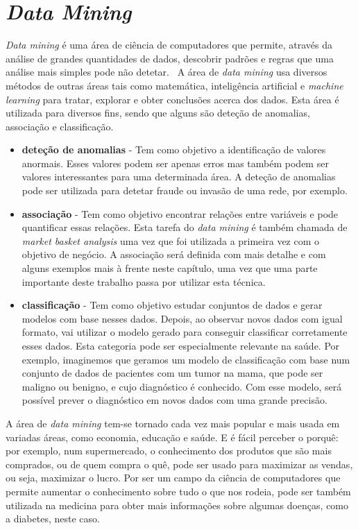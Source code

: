 \section{\textit{Data Mining}}

\textit{Data mining} é uma área de ciência de computadores que permite, através da análise de grandes quantidades de dados, descobrir padrões e regras que uma análise mais simples pode não detetar.~\cite{oracle}
A área de \textit{data mining} usa diversos métodos de outras áreas tais como matemática, inteligência artificial e \textit{machine learning} para tratar, explorar e obter conclusões acerca dos dados. Esta área é utilizada para diversos fins, sendo que alguns são deteção de anomalias, associação e classificação. 

\begin{itemize}

\item{\textbf{deteção de anomalias}} - 
Tem como objetivo a identificação de valores anormais. Esses valores podem ser apenas erros mas também podem ser valores interessantes para uma determinada área. A deteção de anomalias pode ser utilizada para detetar fraude ou invasão de uma rede, por exemplo.

\item{\textbf{associação}} - 
Tem como objetivo encontrar relações entre variáveis e pode quantificar essas relações. Esta tarefa do \textit{data mining} é também chamada de \textit{market basket analysis} uma vez que foi utilizada a primeira vez com o objetivo de negócio. A associação será definida com mais detalhe e com alguns exemplos mais à frente neste capítulo, uma vez que uma parte importante deste trabalho passa por utilizar esta técnica. 

\item{\textbf{classificação}} - 
Tem como objetivo estudar conjuntos de dados e gerar modelos com base nesses dados. Depois, ao observar novos dados com igual formato, vai utilizar o modelo gerado para conseguir classificar corretamente esses dados. Esta categoria pode ser especialmente relevante na saúde. Por exemplo, imaginemos que geramos um modelo de classificação com base num conjunto de dados de pacientes com um tumor na mama, que pode ser maligno ou benigno, e cujo diagnóstico é conhecido. Com esse modelo, será possível prever o diagnóstico em novos dados com uma grande precisão. 


\end{itemize}

A área de \textit{data mining} tem-se tornado cada vez mais popular e mais usada em variadas áreas, como economia, educação e saúde. E é fácil perceber o porquê: por exemplo, num supermercado, o conhecimento dos produtos que são mais comprados, ou de quem compra o quê, pode ser usado para maximizar as vendas, ou seja, maximizar o lucro. Por ser um campo da ciência de computadores que permite aumentar o conhecimento sobre tudo o que nos rodeia, pode ser também utilizada na medicina para obter mais informações sobre algumas doenças, como a diabetes, neste caso.

